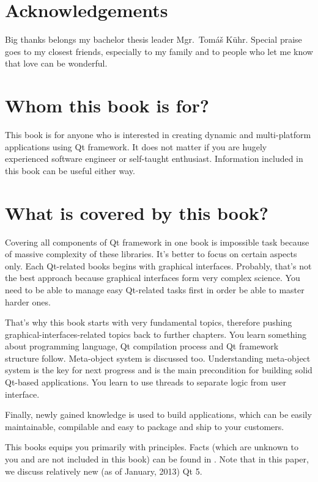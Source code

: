 \section*{Acknowledgements}
Big thanks belongs my bachelor thesis leader Mgr.~Tomáš Kühr. Special praise goes to my closest friends, especially to my family and to people who let me know that love can be wonderful.

\clearpage

\section*{Whom this book is for?}
This book is for anyone who is interested in creating dynamic and multi-platform applications using Qt framework. It does not matter if you are hugely experienced software engineer or self-taught enthusiast. Information included in this book can be useful either way.

\section*{What is covered by this book?}
Covering all components of Qt framework in one book is impossible task because of massive complexity of these libraries. It's better to focus on certain aspects only. Each Qt-related books begins with graphical interfaces. Probably, that's not the best approach because graphical interfaces form very complex science. You need to be able to manage easy Qt-related tasks first in order be able to master harder ones.

That's why this book starts with very fundamental topics, therefore pushing graphical-interfaces-related topics back to further chapters. You learn something about \cpp programming language, Qt compilation process and Qt framework structure follow. Meta-object system is discussed too. Understanding meta-object system is the key for next progress and is the main precondition for building solid Qt-based applications. You learn to use threads to separate logic from user interface.

Finally, newly gained knowledge is used to build applications, which can be easily maintainable, compilable and easy to package and ship to your customers.

This books equips you primarily with principles. Facts (which are unknown to you and are not included in this book) can be found in \citep{various:qtdoc}. Note that in this paper, we discuss relatively new (as of January, 2013) Qt 5.

